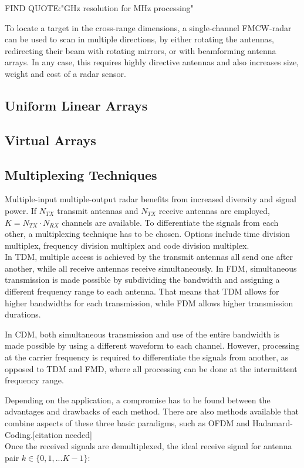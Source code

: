 FIND QUOTE:"GHz resolution for MHz processing"

To locate a target in the cross-range dimensions,
a single-channel FMCW-radar can be used to scan in multiple directions,
by either rotating the antennas, redirecting their beam with rotating mirrors, or with beamforming antenna arrays.
In any case, this requires highly directive antennas and also increases size, weight and cost of a radar sensor.

\subsection{Uniform Linear Arrays}

\subsection{Virtual Arrays}

\subsection{Multiplexing Techniques}
Multiple-input multiple-output radar benefits from increased diversity and signal power.
If $N_{TX}$ transmit antennas and $N_{TX}$ receive antennas are employed, $K=N_{TX} \cdot N_{RX}$ channels are available.
To differentiate the signals from each other, a multiplexing technique has to be chosen.
Options include time division multiplex, frequency division multiplex and code division multiplex. \\

In TDM, multiple access is achieved by the transmit antennas all send one after another,
while all receive antennas receive simultaneously.
In FDM, simultaneous transmission is made possible by subdividing the bandwidth and assigning a different frequency range to each antenna.
That means that TDM allows for higher bandwidths for each transmission, while FDM allows higher transmission durations.

In CDM, both simultaneous transmission and use of the entire bandwidth is made possible by using a different waveform to each channel.
However, processing at the carrier frequency is required to differentiate the signals from another, as opposed to TDM and FMD,
where all processing can be done at the intermittent frequency range.

Depending on the application, a compromise has to be found between the advantages and drawbacks of each method.
There are also methods available that combine aspects of these three basic paradigms, such as OFDM and Hadamard-Coding.[citation needed] \\
Once the received signals are demultiplexed, the ideal receive signal for antenna pair $k \in \{0,1,...K-1\}$:

